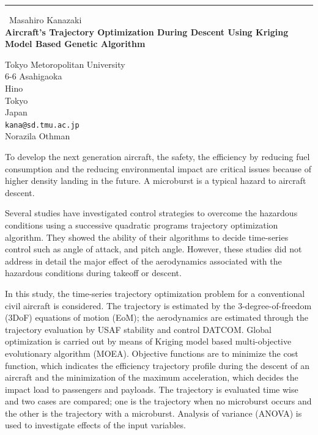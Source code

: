 \documentclass{report}
\begin{document}
\begin{center}
\rule{6in}{1pt} \
{\large Masahiro Kanazaki \\
{\bf Aircraft's Trajectory Optimization During Descent Using Kriging Model Based Genetic Algorithm}}

Tokyo Metoropolitan University \\ 6-6 Asahigaoka \\ Hino \\ Tokyo \\ Japan
\\
{\tt kana@sd.tmu.ac.jp}\\
Norazila Othman\end{center}

To develop the next generation aircraft, the safety, the efficiency by
reducing fuel consumption and the reducing environmental impact are
critical issues because of higher density landing in the future. A
microburst is a typical hazard to aircraft descent.

Several studies have investigated control strategies to overcome the
hazardous conditions using a successive quadratic programs trajectory
optimization algorithm. They showed the ability of their algorithms to
decide time-series control such as angle of attack, and pitch angle.
However, these studies did not address in detail the major effect of the
aerodynamics associated with the hazardous conditions during takeoff or
descent.

In this study, the time-series trajectory optimization problem for a
conventional civil aircraft is considered. The trajectory is estimated by
the 3-degree-of-freedom (3DoF) equations of motion (EoM); the
aerodynamics are estimated through the trajectory evaluation by USAF
stability and control DATCOM. Global optimization is carried out by means
of Kriging model based multi-objective evolutionary algorithm (MOEA).
Objective functions are to minimize the cost function, which indicates
the efficiency trajectory profile during the descent of an aircraft and
the minimization of the maximum acceleration, which decides the impact
load to passengers and payloads. The trajectory is evaluated time wise
and two cases are compared; one is the trajectory when no microburst
occurs and the other is the trajectory with a microburst. Analysis of
variance (ANOVA) is used to investigate effects of the input variables.
\end{document}
